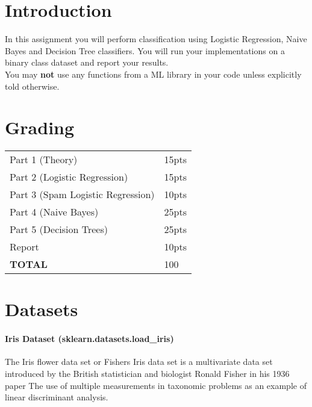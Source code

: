 \documentclass[12pt]{article}
\begin{document}
\maketitle


\section*{Introduction}
In this assignment you will perform classification using Logistic Regression, Naive Bayes and Decision Tree classifiers.  You will run your implementations on  a binary class dataset and report your results.\\

\noindent
You may \textbf{not} use any functions from a ML library in your code unless explicitly told otherwise.  

\section*{Grading}
\begin{table}[h]
\begin{center}
\begin{tabular}{|l|l|}
\hline
Part 1 (Theory) & 15pts \\
Part 2 (Logistic Regression) & 15pts\\
Part 3 (Spam Logistic Regression) & 10pts\\
Part 4 (Naive Bayes) & 25pts\\
Part 5 (Decision Trees) & 25pts\\
Report & 10pts\\
\hline
\textbf{TOTAL} & 100\\
\hline
\end{tabular}
\end{center}
\end{table}

\newpage
\section*{Datasets}
\paragraph{Iris Dataset  (sklearn.datasets.load\_iris)}
The Iris flower data set or Fishers Iris data set is a multivariate data set introduced by the British statistician and biologist Ronald Fisher in his 1936 paper The use of multiple measurements in taxonomic problems as an example of linear discriminant analysis.
\end{document}
